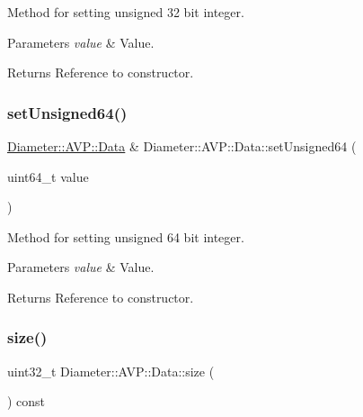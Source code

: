 Method for setting unsigned 32 bit integer. 


\begin{DoxyParams}{Parameters}
{\em value} & Value. \\
\hline
\end{DoxyParams}
\begin{DoxyReturn}{Returns}
Reference to constructor. 
\end{DoxyReturn}
\mbox{\label{classDiameter_1_1AVP_1_1Data_a6d04d160fd5093e2b68300d4dc5a6839}} 
\subsubsection{\texorpdfstring{set\+Unsigned64()}{setUnsigned64()}}
{\footnotesize\ttfamily \hyperlink{classDiameter_1_1AVP_1_1Data}{Diameter\+::\+A\+V\+P\+::\+Data} \& Diameter\+::\+A\+V\+P\+::\+Data\+::set\+Unsigned64 (\begin{DoxyParamCaption}\item[{uint64\+\_\+t}]{value }\end{DoxyParamCaption})}



Method for setting unsigned 64 bit integer. 


\begin{DoxyParams}{Parameters}
{\em value} & Value. \\
\hline
\end{DoxyParams}
\begin{DoxyReturn}{Returns}
Reference to constructor. 
\end{DoxyReturn}
\mbox{\label{classDiameter_1_1AVP_1_1Data_a5ba282bdc28fe77ef680bba192a57d2c}} 
\subsubsection{\texorpdfstring{size()}{size()}}
{\footnotesize\ttfamily uint32\+\_\+t Diameter\+::\+A\+V\+P\+::\+Data\+::size (\begin{DoxyParamCaption}{ }\end{DoxyParamCaption}) const}



